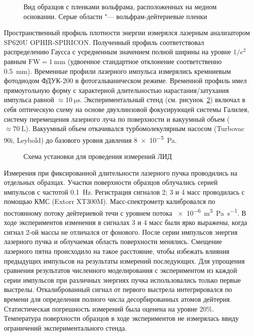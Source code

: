 \begin{figure}[ht]
    \caption{Вид образцов с пленками вольфрама, расположенных на медном основании. Серые области "--- вольфрам-дейтериевые пленки}\label{fig:ch4/LID_target}
\end{figure}

Пространственный профиль плотности энергии измерялся лазерным анализатором SP620U OPHIR-SPIRICON. Полученный профиль соответствовал распределению Гаусса с усредненным значением полной ширины на уровне $1/e^2$ равным \(\mathrm{FW}=\SI{1}{\milli\metre}\) (удвоенное стандартное отклонение соответственно \SI{0.5}{\milli\meter}). Временные профили лазерного импульса измерялись кремниевым фотодиодом ФДУК-200 в фотогальваническом режиме. Временной профиль имел прямоугольную форму с характерной длительностью нарастания/затухания импульса равной \( \approx \SI{10}{\micro\second} \). Экспериментальный стенд (см. рисунок~\ref{fig:ch4/LID_scheme}) включал в себя оптическую схему на основе двухлинзовой фокусирующей системы Галилея, систему перемещения лазерного луча по поверхности и вакуумный объем ($\approx\SI{70}{\liter}$). Вакуумный объем откачивался турбомолекулярным насосом (Turbovac 90i, Leybold) до базового уровня давления \SI{8e-5}{\pascal}.

\begin{figure}[ht]
    \caption{Схема установки для проведения измерений ЛИД~\cite{Medvedev2024}}\label{fig:ch4/LID_scheme}
\end{figure}

Измерения при фиксированной длительности лазерного пучка проводились на отдельных образцах. Участки поверхности образцов облучались серией импульсов с частотой \SI{0.1}{\hertz}. Регистрация сигналов 2; 3 и 4 масс проводилась с помощью КМС (Extorr XT300M). Масс-спектрометр калибровался по постоянному потоку дейтериевой течи с уровнем потока \SI{e-6}{\metre\cubed\pascal\per\second}. В ходе экспериментов изменения в сигналах 3 и 4 масс были ярко выражены, когда сигнал 2-ой массы не отличался от фонового. После серии импульсов энергия лазерного пучка и облучаемая область поверхности менялись. Смещение лазерного пятна происходило на такое расстояние, чтобы избежать влияния предыдущих импульсов на результаты измерений последующих. Для упрощения сравнения результатов численного моделирования с экспериментом из каждой серии импульсов при различных энергиях пучка использовались только первые выстрелы. Откалиброванный сигнал от первого выстрела интегрировался по времени для определения полного числа десорбированных атомов дейтерия. Статистическая погрешность измерений была оценена на уровне 20\%. Температура поверхности образцов в ходе экспериментов не измерялась ввиду ограничений экспериментального стенда.

